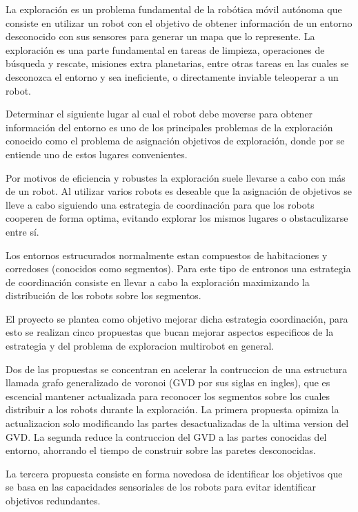 La exploración es un problema fundamental de la robótica móvil autónoma que
consiste en utilizar un robot con el objetivo de obtener información de un
entorno desconocido con sus sensores para generar un mapa que lo represente. La
exploración es una parte fundamental en tareas de limpieza, operaciones de
búsqueda y rescate, misiones extra planetarias, entre otras tareas en las
cuales se desconozca el entorno y sea ineficiente, o directamente inviable
teleoperar a un robot.

Determinar el siguiente lugar al cual el robot debe moverse para obtener
información del entorno es uno de los principales problemas de la exploración
conocido como el problema de asignación objetivos de exploración, donde por
 se entiende uno de estos lugares convenientes. 

Por motivos de eficiencia y robustes la exploración suele llevarse a cabo con
más de un robot. Al utilizar varios robots es deseable que la asignación de
objetivos se lleve a cabo siguiendo una estrategia de coordinación para que los
robots cooperen de forma optima, evitando explorar los mismos lugares o
obstaculizarse entre sí.

Los entornos estrucurados normalmente estan compuestos de habitaciones y
corredoses (conocidos como segmentos). Para este tipo de entronos una
estrategia de coordinación consiste en llevar a cabo la exploración maximizando
la distribución de los robots sobre los segmentos. 

El proyecto se plantea como objetivo mejorar dicha estrategia coordinación,
para esto se realizan cinco propuestas que bucan mejorar aspectos especificos
de la estrategia y del problema de exploracion multirobot en general.

Dos de las propuestas se concentran en acelerar la contruccion de una
estructura llamada grafo generalizado de voronoi (GVD por sus siglas en
ingles), que es escencial mantener actualizada para reconocer los segmentos
sobre los cuales distribuir a los robots durante la exploración. La primera
propuesta opimiza la actualizacion solo modificando las partes desactualizadas
de la ultima version del GVD. La segunda reduce la contruccion del GVD a las
partes conocidas del entorno, ahorrando el tiempo de construir sobre las
paretes desconocidas.

La tercera propuesta consiste en forma novedosa de identificar los objetivos
que se basa en las capacidades sensoriales de los robots para evitar
identificar objetivos redundantes.

